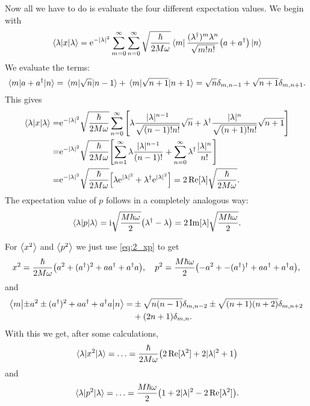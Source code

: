 \documentclass[11pt,letter, swedish, english
]{article}
\begin{document}
Now all we have to do is evaluate the four different expectation
values. We begin with
\begin{equation}
\ev{x}{\lambda}=\ee^{-|\lambda|^2}
\sum_{m=0}^\infty\sum_{n=0}^\infty\sqrt{\frac{\hbar}{2M\omega}}
\bra{m}\frac{(\lambda^\dagger)^m\lambda^{n}}{\sqrt{m!n!}}\qty(a+a^\dagger)
\ket{n}
\end{equation}
We evaluate the terms:
\begin{equation}
\mel{m}{a+a^\dagger}{n}=\mel{m}{\sqrt{n}}{n-1}+\mel{m}{\sqrt{n+1}}{n+1}
=\sqrt{n}\delta_{m, n-1}+\sqrt{n+1}\delta_{m, n+1}.
\end{equation}
This gives
\begin{equation}
\begin{aligned}
\ev{x}{\lambda}=&\ee^{-|\lambda|^2}
\sqrt{\frac{\hbar}{2M\omega}}\sum_{n=0}^\infty
\qty[
\lambda\frac{|\lambda|^{n-1}}{\sqrt{(n-1)!n!}}\sqrt{n} 
+\lambda^\dagger\frac{|\lambda|^{n}}{\sqrt{(n+1)!n!}}\sqrt{n+1} 
]\\
=&\ee^{-|\lambda|^2}\sqrt{\frac{\hbar}{2M\omega}}
\qty[
\sum_{n=1}^\infty\lambda\frac{|\lambda|^{n-1}}{(n-1)!}
+\sum_{n=0}^\infty\lambda^\dagger\frac{|\lambda|^{n}}{n!}
]\\
=&\ee^{-|\lambda|^2}\sqrt{\frac{\hbar}{2M\omega}}
\qty[\lambda\ee^{|\lambda|^2}
+\lambda^\dagger\ee^{|\lambda|^2}]
=2\Re[\lambda]\sqrt{\frac{\hbar}{2M\omega}}.
\end{aligned}
\end{equation}
The expectation value of $p$ follows in a completely analogous way: 
\begin{equation}
\ev{p}{\lambda}=\ii\sqrt{\frac{M\hbar\omega}{2}}\qty(\lambda^\dagger-\lambda)
=2\Im[\lambda]\sqrt{\frac{M\hbar\omega}{2}}.
\end{equation}

For $\ev{x^2}$ and $\ev{p^2}$ we just use \eqref{eq:2_xp} to get
\begin{equation}
x^2=\frac{\hbar}{2M\omega}
\qty(a^2+(a^\dagger)^2+aa^\dagger+a^{\dagger}a)\qcomma
p^2=\frac{M\hbar\omega}{2}
\qty(-a^2+-(a^\dagger)^\dagger + aa^\dagger + a^{\dagger}a),
\end{equation}
and
\begin{equation}
\begin{aligned}
\mel**{m}{\pm{}a^2\pm(a^\dagger)^2+aa^\dagger+a^{\dagger}a}{n}=&
\pm\sqrt{n(n-1)}\delta_{m, n-2} \pm\sqrt{(n+1)(n+2)}\delta_{m, n+2}\\
&+(2n+1)\delta_{m, n}. 
\end{aligned}
\end{equation}
With this we get, after some calculations,
\begin{equation}
\ev{x^2}{\lambda}=\ldots=
\frac{\hbar}{2M\omega}\qty(2\Re[\lambda^2] + 2|\lambda|^2 + 1)
\end{equation}
and
\begin{equation}
\ev{p^2}{\lambda}=\ldots=
\frac{M\hbar\omega}{2}\qty(1+2|\lambda|^2 - 2\Re[\lambda^2]).
\end{equation}
\end{document}
